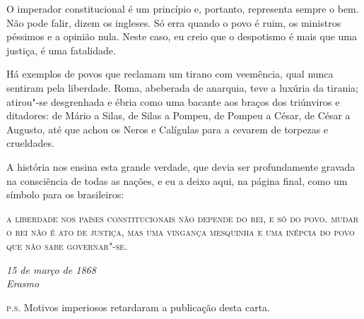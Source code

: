  O imperador constitucional é um princípio e, portanto, representa
sempre o bem. Não pode falir, dizem os ingleses. Só erra quando o povo
é ruim, os ministros péssimos e a opinião nula. Neste caso, eu creio
que o despotismo é mais que uma justiça, é uma fatalidade.

 Há exemplos de povos que reclamam um tirano com veemência, qual nunca
sentiram pela liberdade. Roma, abeberada de anarquia, teve a luxúria da
tirania; atirou"-se desgrenhada e ébria como uma bacante aos braços
dos triúnviros e ditadores: de Mário a Silas, de Silas a Pompeu, de
Pompeu a César, de César a Augusto, até que achou os Neros e Calígulas
para a cevarem de torpezas e crueldades.

 A história nos ensina esta grande verdade, que devia ser profundamente
gravada na consciência de todas as nações, e eu a deixo aqui, na página
final, como um símbolo para os brasileiros:

\pagebreak 

\textsc{a liberdade nos países constitucionais não depende do rei, e só do
povo. mudar o rei não é ato de justiça, mas uma vingança mesquinha e
uma inépcia do povo que não sabe governar"-se.}

\begin{flushright}
\textit{15 de março de 1868\\
Erasmo}
\end{flushright}
 

\noindent\textsc{p.s.} Motivos imperiosos retardaram a publicação desta carta.

\endgroup


